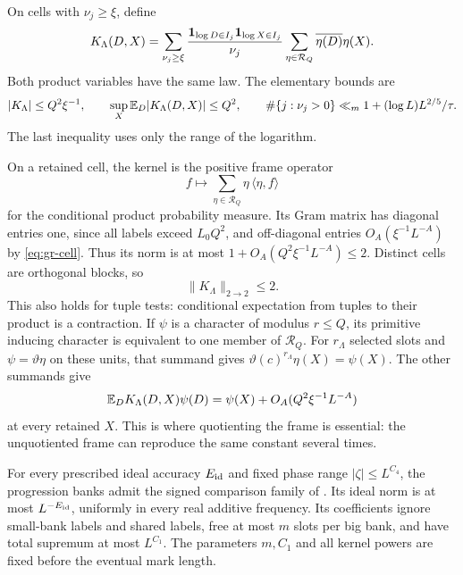 On cells with \(\nu_j\ge\xi\), define
\begin{equation}
 K_\Lambda(D,X)=
 \sum_{\nu_j\ge\xi}
 \frac{\mathbf 1_{\log D\in I_j}\mathbf 1_{\log X\in I_j}}{\nu_j}
 \sum_{\eta\in\mathcal R_Q}\overline{\eta(D)}\eta(X).
 \label{eq:gr-kernel}
\end{equation}
Both product variables have the same law.  The elementary bounds are
\begin{equation}
 |K_\Lambda|\le Q^2\xi^{-1},\qquad
 \sup_X\mathbb E_D|K_\Lambda(D,X)|\le Q^2,\qquad
 \#\{j:\nu_j>0\}\ll_m1+(\log L)L^{2/5}/\tau.              \label{eq:gr-kernel-bounds}
\end{equation}
The last inequality uses only the range of the logarithm.

On a retained cell, the kernel is the positive frame operator
\[
 f\longmapsto
 \sum_{\eta\in\mathcal R_Q}\eta\,\langle\eta,f\rangle
\]
for the conditional product probability measure.
Its Gram matrix has diagonal entries one, since all labels exceed
\(L_0Q^2\), and off-diagonal entries
\(O_A(\xi^{-1}L^{-A})\) by \eqref{eq:gr-cell}.
Thus its norm is at most
\(1+O_A(Q^2\xi^{-1}L^{-A})\le2\).
Distinct cells are orthogonal blocks, so
\begin{equation}
             \|K_\Lambda\|_{2\to2}\le2.                \label{eq:gr-frame-norm}
\end{equation}
This also holds for tuple tests: conditional expectation from tuples
to their product is a contraction.
If \(\psi\) is a character of modulus \(r\le Q\), its primitive
inducing character is equivalent to one member of \(\mathcal R_Q\).
For \(r_\Lambda\) selected slots and \(\psi=\vartheta\eta\) on
these units, that summand gives
\(\vartheta(c)^{r_\Lambda}\eta(X)=\psi(X)\). The other summands give
\begin{equation}
 \mathbb E_D K_\Lambda(D,X)\psi(D)
       =\psi(X)+O_A(Q^2\xi^{-1}L^{-A})                 \label{eq:gr-reproduce}
\end{equation}
at every retained \(X\).  This is where quotienting the frame is
essential: the unquotiented frame can reproduce the same constant
several times.

\begin{lemma}\label{lem:gr-ideal}
For every prescribed ideal accuracy \(E_{\rm id}\) and fixed phase
range \(|\zeta|\le L^{C_4}\), the progression banks admit the signed
comparison family of \cite[Theorem~4.1]{weightedgraphs}.
Its ideal norm is at most \(L^{-E_{\rm id}}\), uniformly in every
real additive frequency.  Its coefficients ignore small-bank labels
and shared labels, free at most \(m\) slots per big bank, and have
total supremum at most \(L^{C_1}\).
The parameters \(m,C_1\) and all kernel powers are fixed before the
eventual mark length.
\end{lemma}

